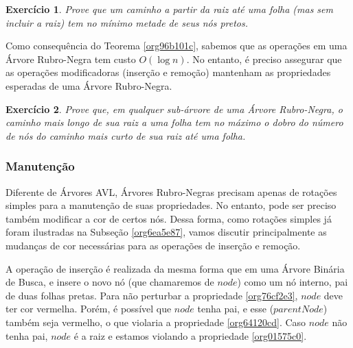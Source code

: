 \documentclass[11pt]{article}
\newtheorem{exercicio}{Exercício}
\begin{document}
\begin{exercicio}
\label{orgf2a1ed6}
Prove que um caminho a partir da raiz até uma folha (mas sem
incluir a raiz) tem no mínimo metade de seus nós pretos.
\end{exercicio}

Como consequência do Teorema \ref{org96b101c}, sabemos que as
operações em uma Árvore Rubro-Negra tem custo \(O(\log n)\).  No
entanto, é preciso assegurar que as operações modificadoras
(inserção e remoção) mantenham as propriedades esperadas de uma
Árvore Rubro-Negra.

\begin{exercicio}
Prove que, em qualquer sub-árvore de uma Árvore Rubro-Negra, o
caminho mais longo de sua raiz a uma folha tem no máximo o dobro
do número de nós do caminho mais curto de sua raiz até uma folha.
\end{exercicio}

\subsubsection{Manutenção}
\label{sec:org0fc343d}

Diferente de Árvores AVL, Árvores Rubro-Negras precisam apenas de
rotações simples para a manutenção de suas propriedades.  No
entanto, pode ser preciso também modificar a cor de certos nós.
Dessa forma, como rotações simples já foram ilustradas na Subseção
\ref{org6ea5e87}, vamos discutir principalmente as mudanças de cor
necessárias para as operações de inserção e remoção.

A operação de inserção é realizada da mesma forma que em uma
Árvore Binária de Busca, e insere o novo nó (que chamaremos de
\(node\)) como um nó interno, pai de duas folhas pretas.  Para não
perturbar a propriedade \ref{org76cf2e3}, \(node\) deve ter
cor vermelha.  Porém, é possível que \(node\) tenha pai, e esse
(\(parentNode\)) também seja vermelho, o que violaria a propriedade
\ref{org64120cd}.  Caso \(node\) não tenha pai, \(node\) é a raiz
e estamos violando a propriedade \ref{org01575c0}.
\end{document}
